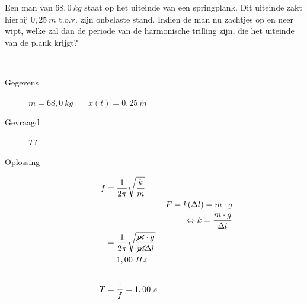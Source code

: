 \documentclass{ximera}
\begin{document}
    \begin{exercise} 
        Een man van $68,0 \ kg$ staat op het uiteinde van een springplank. Dit uiteinde zakt hierbij $0,25 \ m$ t.o.v. zijn onbelaste stand. Indien de man nu zachtjes op en neer wipt, welke zal dan de periode van de harmonische trilling zijn, die het uiteinde van de plank krijgt?
         \begin{oplossing} \ \\
            \begin{description}
                \item [Gegevens] $m=68,0 \ kg$ \ \ \ $x(t)=0,25 \ m$
                \item [Gevraagd] $T$?
                \item [Oplossing]
                \begin{align*}
                    f&=\dfrac{1}{2\pi}\sqrt{\dfrac{k}{m}}\\
                    && F=k(\Delta l)=m\cdot g \\
                    && \Leftrightarrow k=\frac{m\cdot g}{\Delta l} \\
                    &=\dfrac{1}{2\pi}\sqrt{\dfrac{\cancel{m}\cdot g}{\cancel{m}\Delta l}}\\
                    &=1,00 \ Hz \\ \\
                    T&=\dfrac{1}{f}=1,00 \ s
                \end{align*}
            \end{description}
        \end{oplossing}
    \end{exercise}
    
\end{document}
